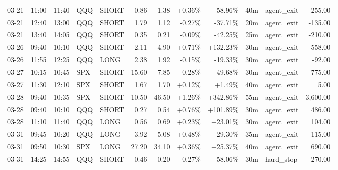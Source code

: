 \documentclass[11pt,a4paper,twoside]{article}
\begin{document}
\begin{center}
\begin{longtable}{>{\color{txtmain}}l l l l l r r r r r >{\color{txtmain}}l r}
03-21 & 11:00 & 11:40 & QQQ & SHORT & 0.86 & 1.38 & \textcolor{wingreen}{+0.36\%} & \textcolor{wingreen}{+58.96\%} & 40m & agent\_exit & \textcolor{wingreen}{255.00} \\
03-21 & 12:40 & 13:00 & QQQ & SHORT & 1.79 & 1.12 & \textcolor{lossred}{-0.27\%} & \textcolor{lossred}{-37.71\%} & 20m & agent\_exit & \textcolor{lossred}{-135.00} \\
03-21 & 13:40 & 14:05 & QQQ & SHORT & 0.35 & 0.21 & \textcolor{lossred}{-0.09\%} & \textcolor{lossred}{-42.25\%} & 25m & agent\_exit & \textcolor{lossred}{-210.00} \\
03-26 & 09:40 & 10:10 & QQQ & SHORT & 2.11 & 4.90 & \textcolor{wingreen}{+0.71\%} & \textcolor{wingreen}{+132.23\%} & 30m & agent\_exit & \textcolor{wingreen}{558.00} \\
03-26 & 11:55 & 12:25 & QQQ & LONG & 2.38 & 1.92 & \textcolor{lossred}{-0.15\%} & \textcolor{lossred}{-19.33\%} & 30m & agent\_exit & \textcolor{lossred}{-92.00} \\
03-27 & 10:15 & 10:45 & SPX & SHORT & 15.60 & 7.85 & \textcolor{lossred}{-0.28\%} & \textcolor{lossred}{-49.68\%} & 30m & agent\_exit & \textcolor{lossred}{-775.00} \\
03-27 & 11:30 & 12:10 & SPX & SHORT & 1.67 & 1.70 & \textcolor{wingreen}{+0.12\%} & \textcolor{wingreen}{+1.49\%} & 40m & agent\_exit & \textcolor{wingreen}{5.00} \\
03-28 & 09:40 & 10:35 & SPX & SHORT & 10.50 & 46.50 & \textcolor{wingreen}{+1.26\%} & \textcolor{wingreen}{+342.86\%} & 55m & agent\_exit & \textcolor{wingreen}{3,600.00} \\
03-28 & 09:40 & 10:10 & QQQ & SHORT & 0.27 & 0.54 & \textcolor{wingreen}{+0.76\%} & \textcolor{wingreen}{+101.89\%} & 30m & agent\_exit & \textcolor{wingreen}{486.00} \\
03-28 & 11:10 & 11:40 & QQQ & LONG & 0.56 & 0.69 & \textcolor{wingreen}{+0.23\%} & \textcolor{wingreen}{+23.01\%} & 30m & agent\_exit & \textcolor{wingreen}{104.00} \\
03-31 & 09:45 & 10:20 & QQQ & LONG & 3.92 & 5.08 & \textcolor{wingreen}{+0.48\%} & \textcolor{wingreen}{+29.30\%} & 35m & agent\_exit & \textcolor{wingreen}{115.00} \\
03-31 & 09:50 & 10:30 & SPX & LONG & 27.20 & 34.10 & \textcolor{wingreen}{+0.36\%} & \textcolor{wingreen}{+25.37\%} & 40m & agent\_exit & \textcolor{wingreen}{690.00} \\
03-31 & 14:25 & 14:55 & QQQ & SHORT & 0.46 & 0.20 & \textcolor{lossred}{-0.27\%} & \textcolor{lossred}{-58.06\%} & 30m & hard\_stop & \textcolor{lossred}{-270.00} \\

\end{longtable}
\end{center}
\end{document}
